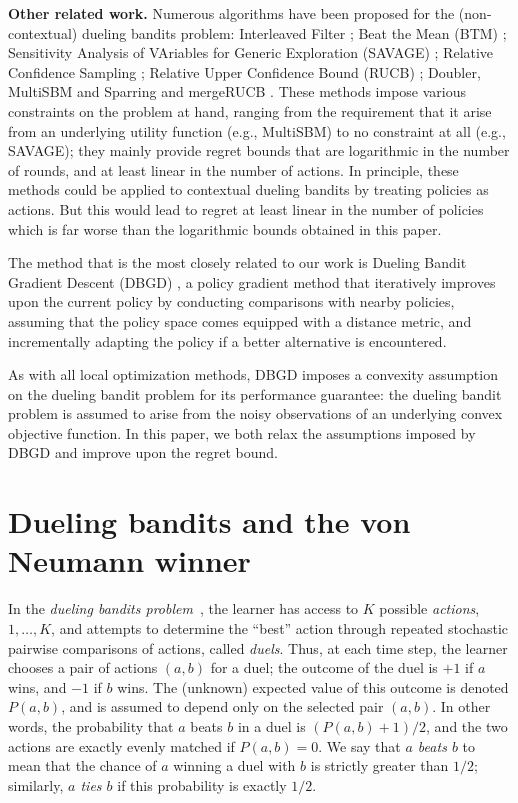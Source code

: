 {\bf Other related work.} Numerous algorithms have been proposed for the (non-contextual) dueling bandits problem: Interleaved Filter \citep{yue09:k-arm}; Beat the Mean (BTM) \citep{yue2011beat}; Sensitivity Analysis of VAriables for Generic Exploration (SAVAGE) \citep{Urvoy:2013}; Relative Confidence Sampling \citep{RCS2014}; Relative Upper Confidence Bound (RUCB) \citep{RUCB2014}; Doubler, MultiSBM and Sparring \citep{Ailon:2014} and mergeRUCB \citep{mergeRUCB2015}. These methods impose various constraints on the problem at hand, ranging from the requirement that it arise from an underlying utility function (e.g., MultiSBM) to no constraint at all (e.g., SAVAGE); they mainly provide regret bounds that are logarithmic in the number of rounds, and at least linear in the number of actions. In principle, these methods could be applied to contextual dueling bandits by treating policies as actions. But this would lead to regret at least linear in the number of policies which is far worse than the logarithmic bounds obtained in this paper.

The method that is the most closely related to our work is Dueling Bandit Gradient Descent (DBGD) \citep{Yue:2009}, a policy gradient method that iteratively improves upon the current policy by conducting comparisons with nearby policies, assuming that the policy space comes equipped with a distance metric, and incrementally adapting the policy if a better alternative is encountered.

As with all local optimization methods, DBGD imposes a convexity assumption on the dueling bandit problem for its performance guarantee: the dueling bandit problem is assumed to arise from the noisy observations of an underlying convex objective function. In this paper, we both relax the assumptions imposed by DBGD and improve upon the regret bound.

\section{Dueling bandits and the von Neumann winner}
\label{sec:vonneumann}

In the \emph{dueling bandits problem}~\citep{yue09:k-arm}, the learner has access to $K$ possible {\em actions},
$1,\ldots,K$, and attempts to determine the ``best'' action through repeated stochastic pairwise comparisons of actions, called {\em duels}. Thus, at each time step, the learner chooses a pair of actions $(a,b)$ for a duel; the outcome of the duel is $+1$ if $a$ wins, and $-1$ if $b$ wins. The (unknown) expected value of this outcome is denoted ${P({a},{b})}$, and is assumed to depend only on the selected pair $(a,b)$. In other words, the probability that $a$ beats $b$ in a duel is $({P({a},{b})} + 1)/2$, and the two actions are exactly evenly matched if ${P({a},{b})}=0$. We say that {\em $a$ beats $b$} to mean that the chance of $a$ winning a duel with $b$ is strictly greater than $1/2$; similarly, {\em $a$ ties $b$} if this probability is exactly $1/2$.

